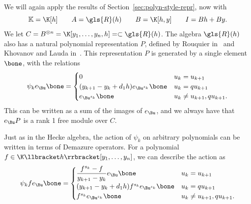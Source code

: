  
We will again apply the results of Section~\ref{sec:polyn-style-repr},
now with 
\begin{equation}
\mathbb{K}=\K[h]\qquad A=\gls{R}(h)\qquad
 B=\K[h,y]\qquad I=Bh+By.\label{eq:KLR-PR}
\end{equation}
We let $C=B^{\otimes n}=\K[y_1,\dots,y_n,h]=\subset \gls{R}(h)$.
The algebra $\gls{R}(h)$ also has a natural polynomial representation $P$, defined
by Rouquier
in~\cite[\S~3.2]{Rou2KM} and Khovanov and Lauda in~\cite[\S~2.3]{KLI}.
 This representation $P$ is generated
by a single element $\bone$, with the relations
\[ \psi_ke_{\Bu}\bone=
\begin{cases}
 0 & u_k=u_{k+1}\\
 (y_{k+1}-y_k+d_1h)e_{\Bu^{s_k}}\bone & u_k=qu_{k+1}\\
 e_{\Bu^{s_k}}\bone & u_k\neq u_{k+1},qu_{k+1}.
\end{cases}
\]
This can be written as a sum of the images of $e_{\Bu}$, and we always
have that $e_{\Bu}P$ is a rank 1 free module over
$C$. 

Just as in the Hecke algebra, the action of $\psi_k$ on arbitrary
polynomials can be written in terms of Demazure operators. For a
polynomial $f\in \K\llbracket h\rrbracket [y_1,\dots, y_n]$, we can describe the action
as 
\begin{equation}
 \psi_k f e_{\Bu}\bone=
\begin{cases}
 \displaystyle \frac{f^{s_k}-f}{y_{k+1}-y_k} e_{\Bu}\bone& u_k=u_{k+1}\\
 (y_{k+1}-y_k+d_1h)f^{s_k}e_{\Bu^{s_k}}\bone & u_k=qu_{k+1}\\
 f^{s_k} e_{\Bu^{s_k}}\bone & u_k\neq u_{k+1},qu_{k+1}.
\end{cases}\label{eq:KLR-action}
\end{equation}

